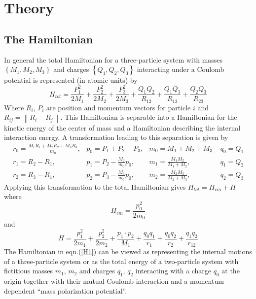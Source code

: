 \documentclass[12pt,thmsa]{article}
\begin{document}
\section{Theory}

\subsection{The Hamiltonian}

In general the total Hamiltonian for a three-particle system with masses $%
\left\{ M_1,M_2,M_3\right\} $ and charges $\left\{ Q_1,Q_2,Q_3\right\} $
interacting under a Coulomb potential is represented (in atomic units) by
\begin{equation}
H_{tot}=\frac{P_1^2}{2M_1}+\frac{P_2^2}{2M_2}+\frac{P_3^2}{2M_3}+\frac{Q_1Q_2%
}{R_{12}}+\frac{Q_1Q_3}{R_{13}}+\frac{Q_2Q_3}{R_{23}}  \label{Htot}
\end{equation}
Where $R_i$, $P_i$ are position and momentum vectors for particle $i$ and $%
R_{ij}=\left\| R_i-R_j\right\| .$ This Hamiltonian is separable into a
Hamiltonian for the kinetic energy of the center of mass and a Hamiltonian
describing the internal interaction energy. A transformation leading to this
separation is given by\cite{Poshusta83}
\begin{equation}
\begin{array}{llll}
r_0=\frac{M_1R_1+M_2R_2+M_3R_3}{m_0}, & p_0=P_1+P_2+P_3, & m_0=M_1+M_2+M_{3,}
& q_0=Q_1 \\ 
r_1=R_2-R_1, & p_1=P_2-\frac{M_2}{m_0}p_0, & m_1=\frac{M_1M_2}{M_1+M_2}, & 
q_1=Q_2 \\ 
r_2=R_3-R_1, & p_2=P_3-\frac{M_3}{m_0}p_0, & m_2=\frac{M_2M_3}{M_2+M_3}, & 
q_2=Q_3
\end{array}
\label{CMtran}
\end{equation}
Applying this transformation to the total Hamiltonian gives $H_{tot}=H_{cm}+H
$ where
\begin{equation}
H_{cm}=\frac{p_0^2}{2m_0}
\end{equation}
and
\begin{equation}
H=\frac{p_1^2}{2m_1}+\frac{p_2^2}{2m_2}+\frac{p_1\cdot p_2}{M_1}+\frac{q_0q_1%
}{r_1}+\frac{q_0q_2}{r_2}+\frac{q_1q_2}{r_{12}}  \label{H1}
\end{equation}
The Hamiltonian in eqn.(\ref{H1}) can be viewed as representing the internal
motions of a three-particle system or as the total energy of a two-particle
system with fictitious masses $m_1$, $m_2$ and charges $q_1,\,q_2$
interacting with a charge $q_0$ at the origin together with their mutual
Coulomb interaction and a momentum dependent ``mass polarization potential''.
\end{document}
